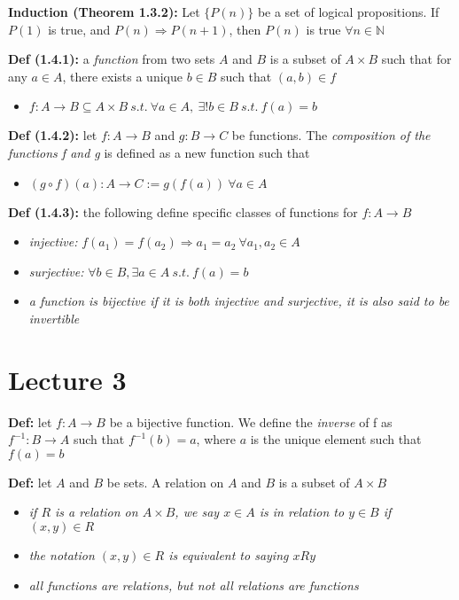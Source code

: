 \documentclass[12pt]{article}
\begin{document}
\textbf{Induction (Theorem 1.3.2):} Let $\{ P(n) \}$ be a set of logical propositions. If $P(1)$ is true, and $P(n) \Rightarrow P(n + 1)$, then $P(n)$ is true $\forall n \in \mathbb{N}$

\textbf{Def (1.4.1): }a \emph{function} from two sets $A$ and $B$ is a subset of $A \times B$ such that for any $a \in A$, there exists a unique $b \in B$ such that $(a, b) \in f$
\begin{itemize}
    \item $f: A \rightarrow B \subseteq A \times B\ s.t.\ \forall a \in A,\ \exists!b \in B\ s.t.\ f(a) = b$
\end{itemize}

\textbf{Def (1.4.2): }let $f: A \rightarrow B$ and $g: B \rightarrow C$ be functions. The \emph{composition of the functions f and g} is defined as a new function such that
\begin{itemize}
    \item $(g \circ f)(a): A \rightarrow C := g(f(a))\ \forall a \in A$
\end{itemize}

\textbf{Def (1.4.3): }the following define specific classes of functions for $f: A \rightarrow B$
\begin{itemize}
    \item \emph{injective: } $f(a_1) = f(a_2) \Rightarrow a_1 = a_2\ \forall a_1, a_2 \in A$
    \item \emph{surjective: } $\forall b \in B, \exists a \in A\ s.t.\ f(a) = b$
    \item \emph{a function is bijective if it is both injective and surjective, it is also said to be invertible}
\end{itemize}

\clearpage

\section{Lecture 3}


\textbf{Def: }let $f: A \rightarrow B$ be a bijective function. We define the \emph{inverse} of f as $f^{-1} : B \rightarrow A$ such that $f^{-1}(b) = a$, where $a$ is the unique element such that $f(a) = b$

\textbf{Def: }let $A$ and $B$ be sets. A relation on $A$
 and $B$ is a subset of $A \times B$
 \begin{itemize}
     \item \emph{if $R$ is a relation on $A \times B$, we say $x \in A$ is in relation to $y \in B$ if $(x, y) \in R$}
     \item \emph{the notation $(x, y) \in R$ is equivalent to saying $xRy$}
     \item \emph{all functions are relations, but not all relations are functions}
 \end{itemize}
 
\end{document}
